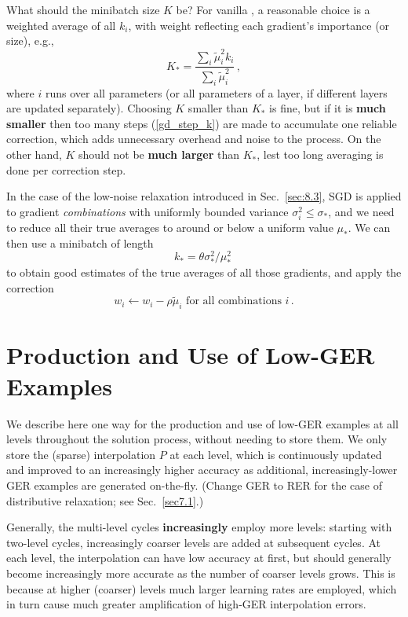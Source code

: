 \documentclass{article} %
\begin{document}
What should the minibatch size $K$ be? For vanilla \SGD, a reasonable choice is a weighted average of all $k_i$, with weight reflecting each gradient's importance (or size), e.g.,
\begin{equation}
  K_* = \frac{\sum_i \tilde{\mu}_i^2 k_i}{\sum_i \tilde{\mu}_i^2}\,,
  \label{k_star}
\end{equation}
where $i$ runs over all parameters (or all parameters of a layer, if different layers are updated separately). Choosing $K$ smaller than $K_*$ is fine, but if it is \textbf{much smaller} then too many steps (\ref{gd_step_k}) are made to accumulate one reliable correction, which adds unnecessary overhead and noise to the process. On the other hand, $K$ should not be \textbf{much larger} than $K_*$, lest too long averaging is done per correction step.

In the case of the low-noise relaxation introduced in Sec.~\ref{sec:8.3}, SGD is applied to gradient {\it combinations} with uniformly bounded variance $\sigma_i^2 \leq \sigma_*$, and we need to reduce all their true averages to around or below a uniform value $\mu_*$. We can then use a minibatch of length
\begin{equation}
    k_* = \theta \sigma_*^2 / \mu_*^2\
    \label{k_star}
\end{equation}
to obtain good estimates of the true averages of all those gradients, and apply the correction
\begin{equation}
    w_i \longleftarrow w_i - \rho \tilde{\mu}_i \text{ for all combinations } i\,.
    \label{correction_tilde}
\end{equation}


\section{Production and Use of Low-GER Examples}
\label{sec:low_ger}

We describe here one way for the production and use of low-GER examples at all levels throughout the solution process, without needing to store them. We only store the (sparse) interpolation $P$ at each level, which is continuously updated and improved to an increasingly higher accuracy as additional, increasingly-lower GER examples are generated on-the-fly. (Change GER to RER for the case of distributive relaxation; see Sec.~\ref{sec7.1}.)

Generally, the multi-level cycles \textbf{increasingly} employ more levels: starting with two-level cycles, increasingly coarser levels are added at subsequent cycles. At each level, the interpolation can have low accuracy at first, but should generally become increasingly more accurate as the number of coarser levels grows. This is because at higher (coarser) levels much larger learning rates are employed, which in turn cause much greater amplification of high-GER interpolation errors.
\end{document}
